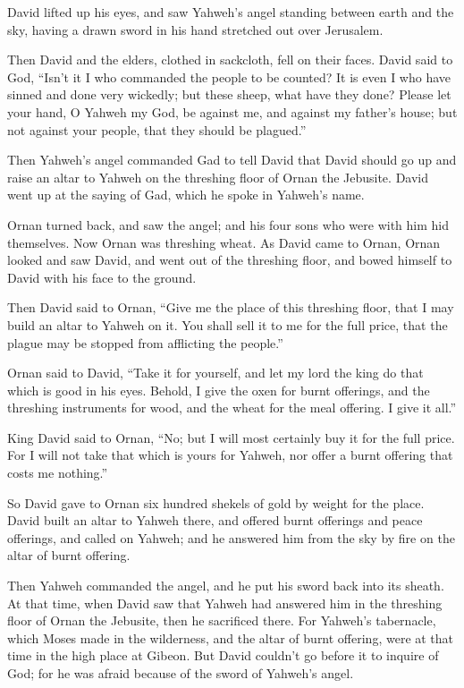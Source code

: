{David lifted up his eyes, and saw Yahweh’s angel standing between earth and the sky, having a drawn sword in his hand stretched out over Jerusalem.
\par }{\PP Then David and the elders, clothed in sackcloth, fell on their faces.
David said to God, “Isn’t it I who commanded the people to be counted? It is even I who have sinned and done very wickedly; but these sheep, what have they done? Please let your hand, O Yahweh my God, be against me, and against my father’s house; but not against your people, that they should be plagued.”
\par }{\PP {}Then Yahweh’s angel commanded Gad to tell David that David should go up and raise an altar to Yahweh on the threshing floor of Ornan the Jebusite.
David went up at the saying of Gad, which he spoke in Yahweh’s name.
\par }{\PP {}Ornan turned back, and saw the angel; and his four sons who were with him hid themselves. Now Ornan was threshing wheat.
As David came to Ornan, Ornan looked and saw David, and went out of the threshing floor, and bowed himself to David with his face to the ground.
\par }{\PP {}Then David said to Ornan, “Give me the place of this threshing floor, that I may build an altar to Yahweh on it. You shall sell it to me for the full price, that the plague may be stopped from afflicting the people.”
\par }{\PP {}Ornan said to David, “Take it for yourself, and let my lord the king do that which is good in his eyes. Behold, I give the oxen for burnt offerings, and the threshing instruments for wood, and the wheat for the meal offering. I give it all.”
\par }{\PP {}King David said to Ornan, “No; but I will most certainly buy it for the full price. For I will not take that which is yours for Yahweh, nor offer a burnt offering that costs me nothing.”
\par }{\PP {}So David gave to Ornan six hundred shekels of gold by weight for the place.
David built an altar to Yahweh there, and offered burnt offerings and peace offerings, and called on Yahweh; and he answered him from the sky by fire on the altar of burnt offering.
\par }{\PP {}Then Yahweh commanded the angel, and he put his sword back into its sheath.
At that time, when David saw that Yahweh had answered him in the threshing floor of Ornan the Jebusite, then he sacrificed there.
For Yahweh’s tabernacle, which Moses made in the wilderness, and the altar of burnt offering, were at that time in the high place at Gibeon.
But David couldn’t go before it to inquire of God; for he was afraid because of the sword of Yahweh’s angel.

}
